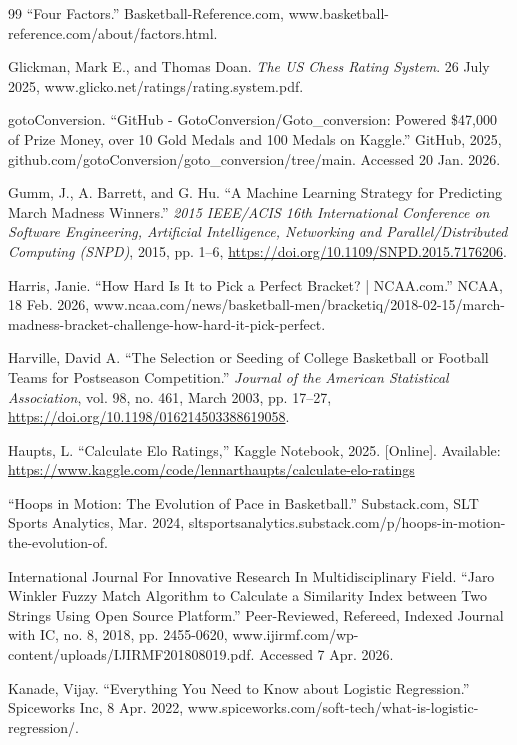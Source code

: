 \documentclass[12pt,leqno]{article}\usepackage[pdftex]{graphicx}\usepackage[dvipsnames]{xcolor}
\theoremstyle{remark}
\begin{document}
\begin{thebibliography}{99}
 “Four Factors.” Basketball-Reference.com, www.basketball-reference.com/about/factors.html.

 Glickman, Mark E., and Thomas Doan. \textit{The US Chess Rating System}. 26 July 2025, www.glicko.net/ratings/rating.system.pdf.

 gotoConversion. “GitHub - GotoConversion/Goto\_conversion: Powered \$47,000 of Prize Money, over 10 Gold Medals and 100 Medals on Kaggle.” GitHub, 2025, github.com/gotoConversion/goto\_conversion/tree/main. Accessed 20 Jan. 2026.

 Gumm, J., A. Barrett, and G. Hu. ``A Machine Learning Strategy for Predicting March Madness Winners.'' \textit{2015 IEEE/ACIS 16th International Conference on Software Engineering, Artificial Intelligence, Networking and Parallel/Distributed Computing (SNPD)}, 2015, pp. 1--6, \url{https://doi.org/10.1109/SNPD.2015.7176206}.

 Harris, Janie. “How Hard Is It to Pick a Perfect Bracket? | NCAA.com.” NCAA, 18 Feb. 2026, www.ncaa.com/news/basketball-men/bracketiq/2018-02-15/march-madness-bracket-challenge-how-hard-it-pick-perfect.

 Harville, David A. ``The Selection or Seeding of College Basketball or Football Teams for Postseason Competition.'' \textit{Journal of the American Statistical Association}, vol. 98, no. 461, March 2003, pp. 17--27, \url{https://doi.org/10.1198/016214503388619058}.

 Haupts, L. ``Calculate Elo Ratings,'' Kaggle Notebook, 2025. [Online]. Available: \url{https://www.kaggle.com/code/lennarthaupts/calculate-elo-ratings}

 “Hoops in Motion: The Evolution of Pace in Basketball.” Substack.com, SLT Sports Analytics, Mar. 2024, sltsportsanalytics.substack.com/p/hoops-in-motion-the-evolution-of.

 International Journal For Innovative Research In Multidisciplinary Field. “Jaro Winkler Fuzzy Match Algorithm to Calculate a Similarity Index between Two Strings Using Open Source Platform.” Peer-Reviewed, Refereed, Indexed Journal with IC, no. 8, 2018, pp. 2455-0620, www.ijirmf.com/wp-content/uploads/IJIRMF201808019.pdf. Accessed 7 Apr. 2026.

 Kanade, Vijay. “Everything You Need to Know about Logistic Regression.” Spiceworks Inc, 8 Apr. 2022, www.spiceworks.com/soft-tech/what-is-logistic-regression/.


\end{thebibliography}
\end{document}
